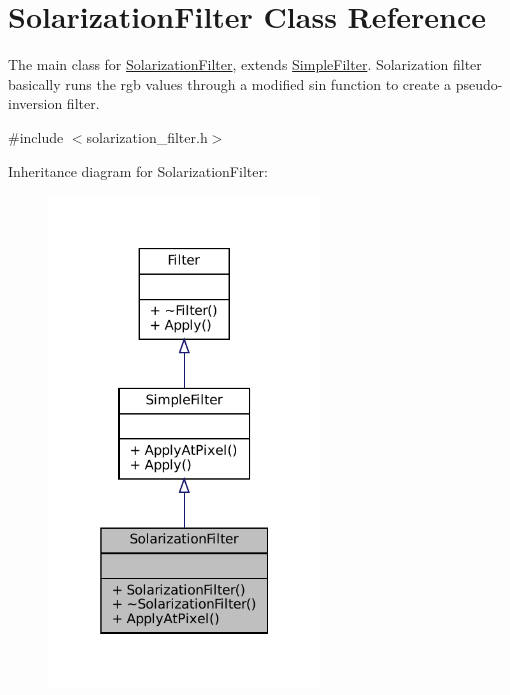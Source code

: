 \hypertarget{classSolarizationFilter}{}\section{Solarization\+Filter Class Reference}
\label{classSolarizationFilter}


The main class for \hyperlink{classSolarizationFilter}{Solarization\+Filter}, extends \hyperlink{classSimpleFilter}{Simple\+Filter}. Solarization filter basically runs the rgb values through a modified sin function to create a pseudo-\/inversion filter.  




{\ttfamily \#include $<$solarization\+\_\+filter.\+h$>$}



Inheritance diagram for Solarization\+Filter\+:\nopagebreak
\begin{figure}[H]
\begin{center}
\leavevmode
\includegraphics[width=205pt]{classSolarizationFilter__inherit__graph}
\end{center}
\end{figure}


